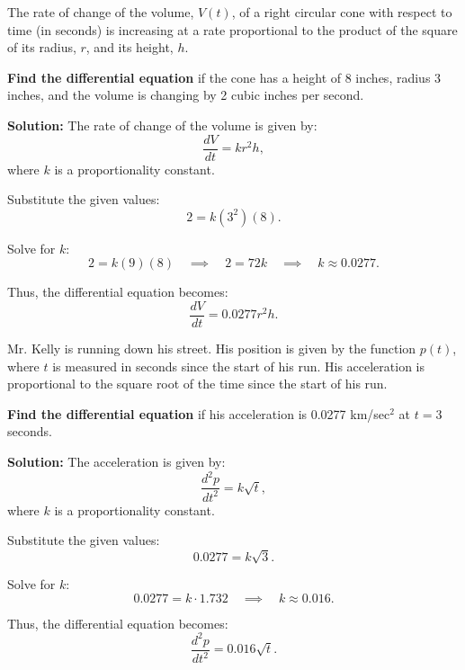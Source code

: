 \documentclass[12pt]{article}
\theoremstyle{beautifulthm}
\begin{document}
\begin{tcolorbox}[colback=examplebg, colframe=red!75!black, title=\textbf{EXAMPLE 2: Real World Problem}, fonttitle=\bfseries, sharp corners]
The rate of change of the volume, \(V(t)\), of a right circular cone with respect to time (in seconds) is increasing at a rate proportional to the product of the square of its radius, \(r\), and its height, \(h\). 

\vspace{3mm}

\textbf{Find the differential equation} if the cone has a height of 8 inches, radius 3 inches, and the volume is changing by 2 cubic inches per second.



\tcblower
\textbf{Solution:} 
The rate of change of the volume is given by:
\[
\frac{dV}{dt} = k r^2 h,
\]
where \(k\) is a proportionality constant.

Substitute the given values:
\[
2 = k (3^2)(8).
\]

Solve for \(k\):
\[
2 = k (9)(8) \quad \implies \quad 2 = 72k \quad \implies \quad k \approx 0.0277.
\]

Thus, the differential equation becomes:
\[
\frac{dV}{dt} = 0.0277 r^2 h.
\]
\end{tcolorbox}


\begin{tcolorbox}[colback=examplebg, colframe=red!75!black, title=\textbf{EXAMPLE 3: Real World Scenarios}, fonttitle=\bfseries, sharp corners]
Mr. Kelly is running down his street. His position is given by the function \(p(t)\), where \(t\) is measured in seconds since the start of his run. His acceleration is proportional to the square root of the time since the start of his run.

\vspace{3mm}

\textbf{Find the differential equation} if his acceleration is 0.0277 km/sec\(^2\) at \(t = 3\) seconds.

\tcblower
\textbf{Solution:} 
The acceleration is given by:
\[
\frac{d^2 p}{dt^2} = k \sqrt{t},
\]
where \(k\) is a proportionality constant.

Substitute the given values:
\[
0.0277 = k \sqrt{3}.
\]

Solve for \(k\):
\[
0.0277 = k \cdot 1.732 \quad \implies \quad k \approx 0.016.
\]

Thus, the differential equation becomes:
\[
\frac{d^2 p}{dt^2} = 0.016 \sqrt{t}.
\]
\end{tcolorbox}
\end{document}
